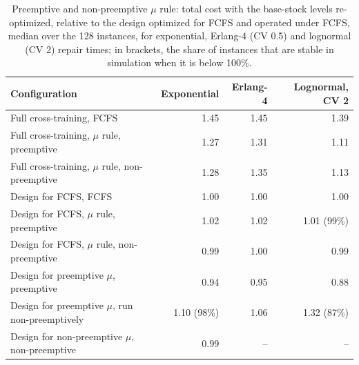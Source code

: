\begin{table}[!htb]
\centering
\caption{Preemptive and non-preemptive $\mu$ rule: total cost with the base-stock levels re-optimized, relative to the design optimized for FCFS and operated under FCFS, median over the 128 instances, for exponential, Erlang-4 (CV 0.5) and lognormal (CV 2) repair times; in brackets, the share of instances that are stable in simulation when it is below 100\%.}
\label{tab:preemption}
\small
\begin{tabular}{@{}lrrr@{}}
\toprule
Configuration & Exponential & Erlang-4 & Lognormal, CV 2 \\
\midrule
Full cross-training, FCFS & 1.45 & 1.45 & 1.39 \\
Full cross-training, $\mu$ rule, preemptive & 1.27 & 1.31 & 1.11 \\
Full cross-training, $\mu$ rule, non-preemptive & 1.28 & 1.35 & 1.13 \\
\midrule
Design for FCFS, FCFS & 1.00 & 1.00 & 1.00 \\
Design for FCFS, $\mu$ rule, preemptive & 1.02 & 1.02 & 1.01 (99\%) \\
Design for FCFS, $\mu$ rule, non-preemptive & 0.99 & 1.00 & 0.99 \\
\midrule
Design for preemptive $\mu$, preemptive & 0.94 & 0.95 & 0.88 \\
Design for preemptive $\mu$, run non-preemptively & 1.10 (98\%) & 1.06 & 1.32 (87\%) \\
Design for non-preemptive $\mu$, non-preemptive & 0.99 & -- & -- \\
\bottomrule
\end{tabular}
\end{table}
